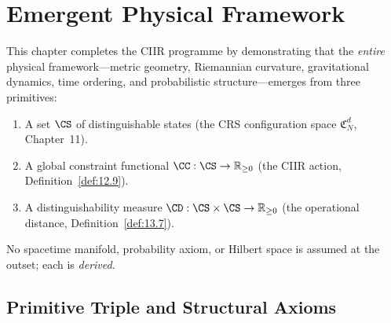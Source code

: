 
\chapter{Emergent Physical Framework}
\label{ch:emergent-physics}

\vspace{0.5em}
\noindent
This chapter completes the CIIR programme by demonstrating that the
\emph{entire} physical framework---metric geometry, Riemannian curvature,
gravitational dynamics, time ordering, and probabilistic structure---emerges
from three primitives:
\begin{enumerate}
  \item A set $\CS$ of distinguishable states (the CRS configuration space
        $\mathfrak{C}_N^d$, Chapter~11).
  \item A global constraint functional
        $\CC : \CS \to \mathbb{R}_{\geq 0}$ (the CIIR action,
        Definition~\ref{def:12.9}).
  \item A distinguishability measure
        $\CD : \CS \times \CS \to \mathbb{R}_{\geq 0}$ (the operational
        distance, Definition~\ref{def:13.7}).
\end{enumerate}
No spacetime manifold, probability axiom, or Hilbert space is assumed at
the outset; each is \emph{derived}.

\section{Primitive Triple and Structural Axioms}
\label{sec:ch14:primitives}

